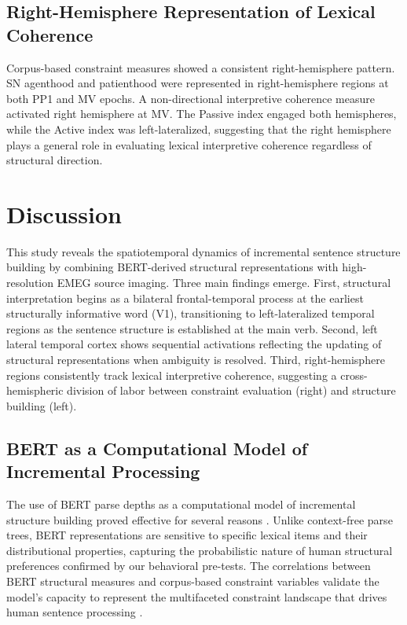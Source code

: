 \documentclass[12pt]{article}
\begin{document}
\subsection{Right-Hemisphere Representation of Lexical Coherence}

Corpus-based constraint measures showed a consistent right-hemisphere pattern. SN agenthood and patienthood were represented in right-hemisphere regions at both PP1 and MV epochs. A non-directional interpretive coherence measure activated right hemisphere at MV. The Passive index engaged both hemispheres, while the Active index was left-lateralized, suggesting that the right hemisphere plays a general role in evaluating lexical interpretive coherence regardless of structural direction.

\section{Discussion}

This study reveals the spatiotemporal dynamics of incremental sentence structure building by combining BERT-derived structural representations with high-resolution EMEG source imaging. Three main findings emerge. First, structural interpretation begins as a bilateral frontal-temporal process at the earliest structurally informative word (V1), transitioning to left-lateralized temporal regions as the sentence structure is established at the main verb. Second, left lateral temporal cortex shows sequential activations reflecting the updating of structural representations when ambiguity is resolved. Third, right-hemisphere regions consistently track lexical interpretive coherence, suggesting a cross-hemispheric division of labor between constraint evaluation (right) and structure building (left).

\subsection{BERT as a Computational Model of Incremental Processing}

The use of BERT parse depths as a computational model of incremental structure building proved effective for several reasons \citep{devlin2019bert, hewitt2019structural}. Unlike context-free parse trees, BERT representations are sensitive to specific lexical items and their distributional properties, capturing the probabilistic nature of human structural preferences confirmed by our behavioral pre-tests. The correlations between BERT structural measures and corpus-based constraint variables validate the model's capacity to represent the multifaceted constraint landscape that drives human sentence processing \citep{brennan2016abstract, hale2001probabilistic}.
\end{document}
